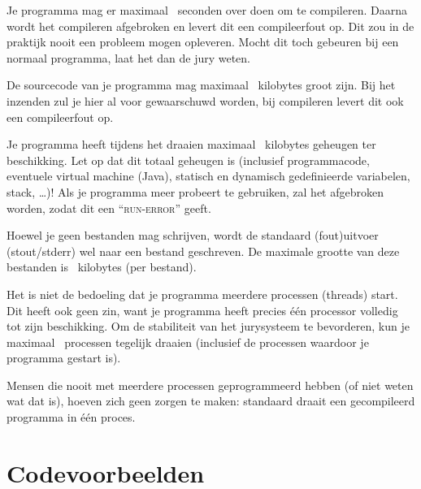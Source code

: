 \begin{description}
\item[compile-tijd]
Je programma mag er maximaal \COMPILETIME\ seconden over doen om te
compileren. Daarna wordt het compileren afgebroken en levert dit een
compileerfout op. Dit zou in de praktijk nooit een probleem mogen
opleveren. Mocht dit toch gebeuren bij een normaal programma, laat het
dan de jury weten.

\item[sourcegrootte]
De sourcecode van je programma mag maximaal \SOURCESIZE\ kilobytes
groot zijn. Bij het inzenden zul je hier al voor gewaarschuwd worden,
bij compileren levert dit ook een compileerfout op.

\item[geheugen]
Je programma heeft tijdens het draaien maximaal \MEMLIMIT\ kilobytes
geheugen ter beschikking. Let op dat dit totaal geheugen is (inclusief
programmacode, eventuele virtual machine (Java), statisch en dynamisch
gedefinieerde variabelen, stack, \dots)! Als je programma meer
probeert te gebruiken, zal het afgebroken worden, zodat dit een
``\textsc{run-error}'' geeft.

\item[bestandsgrootte]
Hoewel je geen bestanden mag schrijven, wordt de standaard (fout)uitvoer
(stout/stderr) wel naar een bestand geschreven. De maximale grootte
van deze bestanden is \FILELIMIT\ kilobytes (per bestand).

\item[aantal processen]
Het is niet de bedoeling dat je programma meerdere processen (threads)
start. Dit heeft ook geen zin, want je programma heeft precies \'e\'en
processor volledig tot zijn beschikking. Om de stabiliteit van het
jurysysteem te bevorderen, kun je maximaal \PROCLIMIT\ processen
tegelijk draaien (inclusief de processen waardoor je programma
gestart is).

Mensen die nooit met meerdere processen geprogrammeerd hebben (of
niet weten wat dat is), hoeven zich geen zorgen te maken: standaard
draait een gecompileerd programma in \'e\'en proces.

\end{description}


\newpage
\appendix

\section{Codevoorbeelden}\label{codeexamples}

